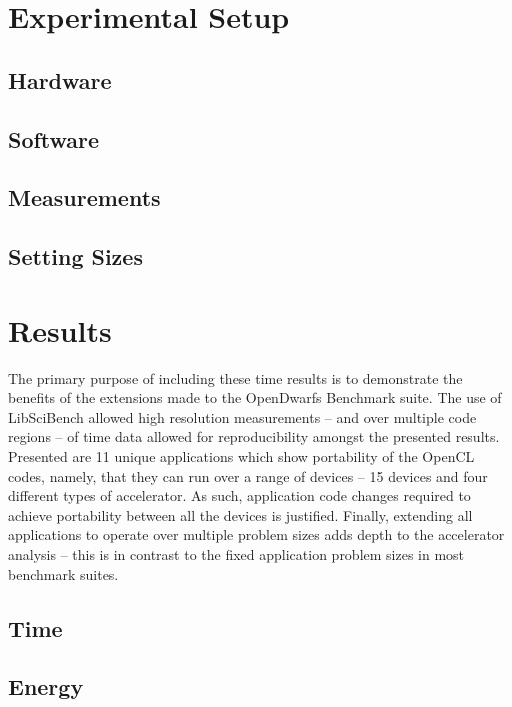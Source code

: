 \documentclass[sigconf,preprint,9pt]{acmart}
\begin{document}
\section{Experimental Setup}\label{sec:experimental_setup}
\subsection{Hardware}
\subsection{Software}
\subsection{Measurements}
\subsection{Setting Sizes}


\section{Results}\label{sec:results}

The primary purpose of including these time results is to demonstrate the benefits of the extensions made to the OpenDwarfs Benchmark suite.
The use of LibSciBench allowed high resolution measurements -- and over multiple code regions -- of time data allowed for reproducibility amongst the presented results.
Presented are 11 unique applications which show portability of the OpenCL codes, namely, that they can run over a range of devices -- 15 devices and four different types of accelerator.
As such, application code changes required to achieve portability between all the devices is justified.
Finally, extending all applications to operate over multiple problem sizes adds depth to the accelerator analysis -- this is in contrast to the fixed application problem sizes in most benchmark suites.

\subsection{Time}
\subsection{Energy}
\end{document}
